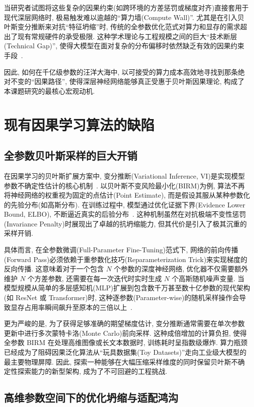 \documentclass[a4paper,punct=banjiao,twoside]{ctexrep}
\theoremstyle{plain}
\theoremstyle{definition}
\theoremstyle{remark}
\begin{document}
当研究者试图将这些复杂的因果约束(如跨环境的方差惩罚或梯度对齐)直接套用于现代深层网络时, 极易触发难以逾越的“算力墙(Compute Wall)”. 尤其是在引入贝叶斯变分推断来对抗“特征坍缩”时, 传统的全参数优化范式对算力和显存的需求超出了现有常规硬件的承受极限. 这种学术理论与工程规模之间的巨大“技术断层(Technical Gap)”, 使得大模型在面对复杂的分布偏移时依然缺乏有效的因果约束手段~\cite{wiles2021fine}. 

因此, 如何在千亿级参数的汪洋大海中, 以可接受的算力成本高效地寻找到那条绝对不变的“因果路径”, 使得深层神经网络能够真正受惠于贝叶斯因果理论, 构成了本课题研究的最核心宏观动机.

\section{现有因果学习算法的缺陷}
\subsection{全参数贝叶斯采样的巨大开销}
在因果学习的贝叶斯扩展方案中, 变分推断(Variational Inference, VI)是实现模型参数不确定性估计的核心机制~\cite{blundell2015weight}. 以贝叶斯不变风险最小化(BIRM)为例, 算法不再将神经网络的权重视为固定的点估计(Point Estimate), 而是假设其服从某种参数化的先验分布(如高斯分布). 在训练过程中, 模型通过优化证据下界(Evidence Lower Bound, ELBO), 不断逼近真实的后验分布~\cite{lin2022bayesian}. 这种机制虽然在对抗极端不变性惩罚(Invariance Penalty)时展现出了卓越的抗坍缩能力, 但其代价是引入了极其沉重的采样开销.

具体而言, 在全参数微调(Full-Parameter Fine-Tuning)范式下, 网络的前向传播(Forward Pass)必须依赖于重参数化技巧(Reparameterization Trick)来实现梯度的反向传播. 这意味着对于一个包含 $N$ 个参数的深度神经网络, 优化器不仅需要额外维护 $N$ 个方差参数, 还需要在每一次迭代时实时生成 $N$ 个高斯随机噪声变量. 当模型规模从简单的多层感知机(MLP)扩展到包含数千万甚至数十亿参数的现代架构(如 ResNet 或 Transformer)时, 这种逐参数(Parameter-wise)的随机采样操作会导致显存占用率瞬间飙升至原本的三倍以上~\cite{jospin2022hands}. 

更为严峻的是, 为了获得足够准确的期望梯度估计, 变分推断通常需要在单次参数更新中进行多次蒙特卡洛(Monte Carlo)前向采样. 这种成倍增加的计算负担, 使得全参数 BIRM 在处理高维图像或长文本数据时, 训练耗时呈指数级爆炸. 算力瓶颈已经成为了阻碍因果泛化算法从“玩具数据集(Toy Datasets)”走向工业级大模型的最主要物理屏障. 因此, 探索一种能够在大幅压缩采样维度的同时保留贝叶斯不确定性探索能力的新型架构, 成为了不可回避的工程挑战.

\subsection{高维参数空间下的优化坍缩与适配鸿沟}
\end{document}
